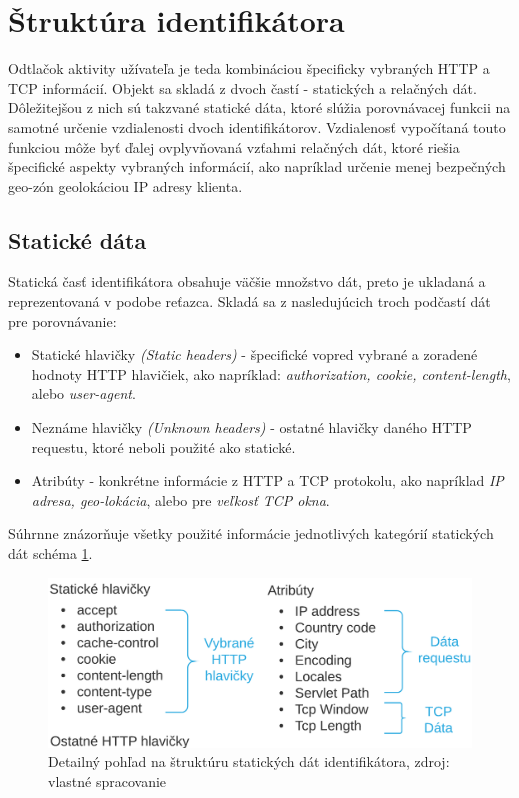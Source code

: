 \documentclass[
  digital, %
  table,   %
  lof,     %
  nolot,   %
  nocover
]{fithesis3}
\begin{document}
\section{Štruktúra identifikátora}
\label{s:footprint-structure}
Odtlačok aktivity užívateľa je teda kombináciou špecificky vybraných HTTP a TCP informácií.
Objekt sa skladá z dvoch častí - statických a relačných dát. Dôležitejšou z
nich sú takzvané statické dáta, ktoré slúžia porovnávacej funkcii na samotné
určenie vzdialenosti dvoch identifikátorov. Vzdialenosť vypočítaná touto
funkciou môže byť ďalej ovplyvňovaná vzťahmi relačných dát, ktoré riešia
špecifické aspekty vybraných informácií, ako napríklad určenie menej bezpečných
geo-zón geolokáciou IP adresy klienta.

\subsection{Statické dáta}
Statická časť identifikátora obsahuje väčšie množstvo dát, preto je
ukladaná a reprezentovaná v podobe reťazca. Skladá sa z nasledujúcich troch podčastí dát pre porovnávanie:
\begin{itemize}
    \item Statické hlavičky \textit{(Static headers)} - špecifické vopred
    vybrané a zoradené hodnoty HTTP hlavičiek, ako napríklad: \textit{authorization, cookie, content-length}, alebo
    \textit{user-agent}.
    \item Neznáme hlavičky \textit{(Unknown headers)} - ostatné hlavičky daného
    HTTP requestu, ktoré neboli použité ako statické.
    \item Atribúty - konkrétne informácie z HTTP a TCP protokolu, ako napríklad
    \textit{IP adresa, geo-lokácia}, alebo pre \textit{veľkosť TCP okna}.
\end{itemize}

Súhrnne znázorňuje všetky použité informácie jednotlivých kategórií statických dát schéma
\ref{fig:footprint-data-static}.

\begin{figure}[h]
  \centering
    \includegraphics[width=.95\textwidth]{images/footprint-data-static.png}
  \caption{Detailný pohľad na štruktúru statických dát identifikátora, zdroj:
  vlastné spracovanie}
  \label{fig:footprint-data-static}
\end{figure}
\end{document}
